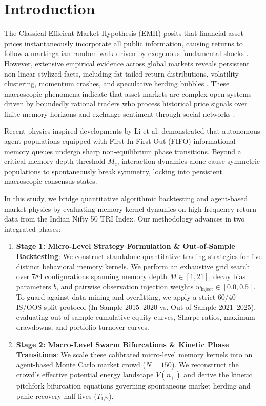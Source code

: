 \documentclass[11pt,a4paper]{article}
\begin{document}
\newpage

\section{Introduction}

The Classical Efficient Market Hypothesis (EMH) posits that financial asset prices instantaneously incorporate all public information, causing returns to follow a martingalian random walk driven by exogenous fundamental shocks \cite{fama1970efficient}. However, extensive empirical evidence across global markets reveals persistent non-linear stylized facts, including fat-tailed return distributions, volatility clustering, momentum crashes, and speculative herding bubbles \cite{shiller2000irrational, lux1999scaling, cont2001empirical}. These macroscopic phenomena indicate that asset markets are complex open systems driven by boundedly rational traders who process historical price signals over finite memory horizons and exchange sentiment through social networks \cite{bouchaud2013more, farmer2009economy, kirman1993ants}.

Recent physics-inspired developments by Li et al. \cite{li2026informational} demonstrated that autonomous agent populations equipped with First-In-First-Out (FIFO) informational memory queues undergo sharp non-equilibrium phase transitions. Beyond a critical memory depth threshold $M_c$, interaction dynamics alone cause symmetric populations to spontaneously break symmetry, locking into persistent macroscopic consensus states.

In this study, we bridge quantitative algorithmic backtesting and agent-based market physics by evaluating memory-kernel dynamics on high-frequency return data from the Indian Nifty 50 TRI Index. Our methodology advances in two integrated phases:

\begin{enumerate}
    \item \textbf{Stage 1: Micro-Level Strategy Formulation \& Out-of-Sample Backtesting}: We construct standalone quantitative trading strategies for five distinct behavioral memory kernels. We perform an exhaustive grid search over 784 configurations spanning memory depth $M \in [1, 21]$, decay bias parameters $b$, and pairwise observation injection weights $w_{\text{inject}} \in [0.0, 0.5]$. To guard against data mining and overfitting, we apply a strict 60/40 IS/OOS split protocol (In-Sample 2015--2020 vs. Out-of-Sample 2021--2025), evaluating out-of-sample cumulative equity curves, Sharpe ratios, maximum drawdowns, and portfolio turnover curves.
    \item \textbf{Stage 2: Macro-Level Swarm Bifurcations \& Kinetic Phase Transitions}: We scale these calibrated micro-level memory kernels into an agent-based Monte Carlo market crowd ($N=150$). We reconstruct the crowd's effective potential energy landscape $V(n_+)$ and derive the kinetic pitchfork bifurcation equations governing spontaneous market herding and panic recovery half-lives ($T_{1/2}$).
\end{enumerate}
\end{document}
